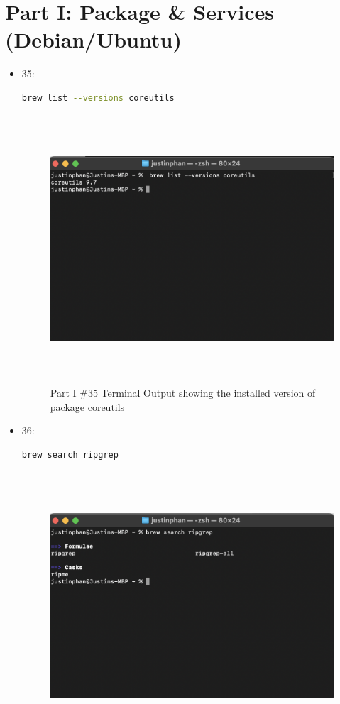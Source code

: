 \section{Part I: Package \& Services (Debian/Ubuntu)}
\begin{itemize}
    \item 35: 
    \begin{lstlisting}[language=Bash]
         brew list --versions coreutils
    \end{lstlisting}
    \begin{figure}[htp]
    \centering
    \includegraphics[width=15cm, height=10cm]{png/LinuxProblemSetPicsPNG/part_i_35.png}
    \caption{Part I \#35 Terminal Output showing the installed version of package coreutils}
    \label{fig:part I 35}
\end{figure}
    \item 36: 
    \begin{lstlisting}[language=Bash]
        brew search ripgrep
    \end{lstlisting}
    \begin{figure}[htp]
    \centering
    \includegraphics[width=15cm, height=10cm]{png/LinuxProblemSetPicsPNG/part_i_36.png}

\end{figure}
\end{itemize}
